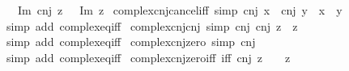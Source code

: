 \begin{isabellebody}
\ \ {\isacharbar}{\kern0pt}\ {\isachardoublequoteopen}Im\ {\isacharparenleft}{\kern0pt}cnj\ z{\isacharparenright}{\kern0pt}\ {\isacharequal}{\kern0pt}\ {\isacharminus}{\kern0pt}\ Im\ z{\isachardoublequoteclose}\isanewline
\isanewline
{}\isamarkupfalse%
\ complex{\isacharunderscore}{\kern0pt}cnj{\isacharunderscore}{\kern0pt}cancel{\isacharunderscore}{\kern0pt}iff\ {\isacharbrackleft}{\kern0pt}simp{\isacharbrackright}{\kern0pt}{\isacharcolon}{\kern0pt}\ {\isachardoublequoteopen}cnj\ x\ {\isacharequal}{\kern0pt}\ cnj\ y\ {\isasymlongleftrightarrow}\ x\ {\isacharequal}{\kern0pt}\ y{\isachardoublequoteclose}\isanewline
%
\isadelimproof
\ \ %
\endisadelimproof
%
\isatagproof
{}\isamarkupfalse%
\ {\isacharparenleft}{\kern0pt}simp\ add{\isacharcolon}{\kern0pt}\ complex{\isacharunderscore}{\kern0pt}eq{\isacharunderscore}{\kern0pt}iff{\isacharparenright}{\kern0pt}%
\endisatagproof
{\isafoldproof}%
%
\isadelimproof
\isanewline
%
\endisadelimproof
\isanewline
{}\isamarkupfalse%
\ complex{\isacharunderscore}{\kern0pt}cnj{\isacharunderscore}{\kern0pt}cnj\ {\isacharbrackleft}{\kern0pt}simp{\isacharbrackright}{\kern0pt}{\isacharcolon}{\kern0pt}\ {\isachardoublequoteopen}cnj\ {\isacharparenleft}{\kern0pt}cnj\ z{\isacharparenright}{\kern0pt}\ {\isacharequal}{\kern0pt}\ z{\isachardoublequoteclose}\isanewline
%
\isadelimproof
\ \ %
\endisadelimproof
%
\isatagproof
{}\isamarkupfalse%
\ {\isacharparenleft}{\kern0pt}simp\ add{\isacharcolon}{\kern0pt}\ complex{\isacharunderscore}{\kern0pt}eq{\isacharunderscore}{\kern0pt}iff{\isacharparenright}{\kern0pt}%
\endisatagproof
{\isafoldproof}%
%
\isadelimproof
\isanewline
%
\endisadelimproof
\isanewline
{}\isamarkupfalse%
\ complex{\isacharunderscore}{\kern0pt}cnj{\isacharunderscore}{\kern0pt}zero\ {\isacharbrackleft}{\kern0pt}simp{\isacharbrackright}{\kern0pt}{\isacharcolon}{\kern0pt}\ {\isachardoublequoteopen}cnj\ {}\ {\isacharequal}{\kern0pt}\ {}{\isachardoublequoteclose}\isanewline
%
\isadelimproof
\ \ %
\endisadelimproof
%
\isatagproof
{}\isamarkupfalse%
\ {\isacharparenleft}{\kern0pt}simp\ add{\isacharcolon}{\kern0pt}\ complex{\isacharunderscore}{\kern0pt}eq{\isacharunderscore}{\kern0pt}iff{\isacharparenright}{\kern0pt}%
\endisatagproof
{\isafoldproof}%
%
\isadelimproof
\isanewline
%
\endisadelimproof
\isanewline
{}\isamarkupfalse%
\ complex{\isacharunderscore}{\kern0pt}cnj{\isacharunderscore}{\kern0pt}zero{\isacharunderscore}{\kern0pt}iff\ {\isacharbrackleft}{\kern0pt}iff{\isacharbrackright}{\kern0pt}{\isacharcolon}{\kern0pt}\ {\isachardoublequoteopen}cnj\ z\ {\isacharequal}{\kern0pt}\ {}\ {\isasymlongleftrightarrow}\ z\ {\isacharequal}{\kern0pt}\ {}{\isachardoublequoteclose}\isanewline

\end{isabellebody}
